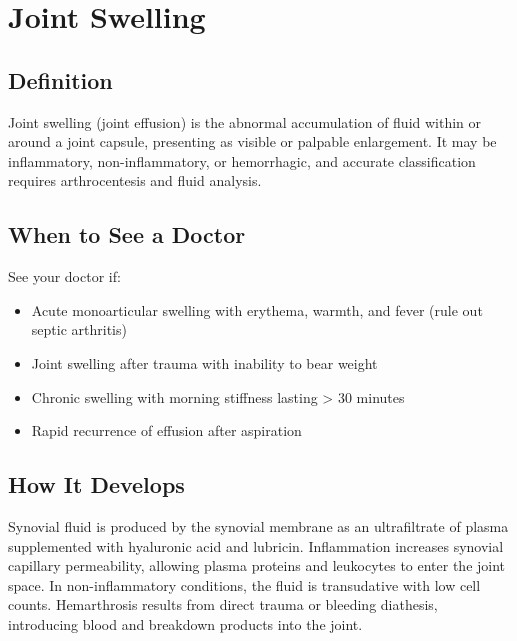 \chapter{Joint Swelling}

\section*{Definition}
Joint swelling (joint effusion) is the abnormal accumulation of fluid within or around a joint capsule, presenting as visible or palpable enlargement. It may be inflammatory, non-inflammatory, or hemorrhagic, and accurate classification requires arthrocentesis and fluid analysis.

\section*{When to See a Doctor}
See your doctor if:
\begin{itemize}
  \item Acute monoarticular swelling with erythema, warmth, and fever (rule out septic arthritis)
  \item Joint swelling after trauma with inability to bear weight
  \item Chronic swelling with morning stiffness lasting > 30 minutes
  \item Rapid recurrence of effusion after aspiration
\end{itemize}

\section*{How It Develops}
Synovial fluid is produced by the synovial membrane as an ultrafiltrate of plasma supplemented with hyaluronic acid and lubricin. Inflammation increases synovial capillary permeability, allowing plasma proteins and leukocytes to enter the joint space. In non-inflammatory conditions, the fluid is transudative with low cell counts. Hemarthrosis results from direct trauma or bleeding diathesis, introducing blood and breakdown products into the joint.

